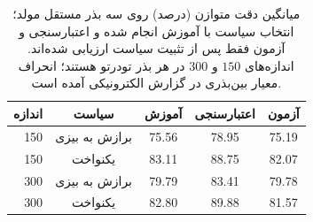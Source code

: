 \begin{table}[htbp]
\centering\small
\caption{میانگین دقت متوازن (درصد) روی سه بذر مستقل مولد؛ انتخاب سیاست با آموزش انجام شده و اعتبارسنجی و آزمون فقط پس از تثبیت سیاست ارزیابی شده‌اند. اندازه‌های $150$ و $300$ در هر بذر تودرتو هستند؛ انحراف معیار بین‌بذری در گزارش الکترونیکی آمده است.}
\label{tab:ch4-sec411-balanced-accuracy}
\begin{tabular}{rcccc}\hline
اندازه & سیاست & آموزش & اعتبارسنجی & آزمون\\ \hline
150 & برازش به بیزی & 75.56 & 78.95 & 75.19 \\
150 & یکنواخت & 83.11 & 88.75 & 82.07 \\
300 & برازش به بیزی & 79.79 & 83.41 & 79.78 \\
300 & یکنواخت & 82.80 & 89.88 & 81.57 \\
\hline
\end{tabular}
\end{table}
